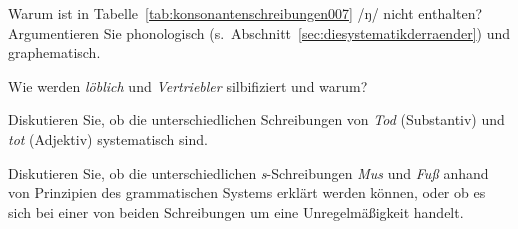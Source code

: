 \Uebung[\tristar]{} \label{exc:phonologischeschreibprinzipien07} Warum ist in Tabelle~\ref{tab:konsonantenschreibungen007} /ŋ/ nicht enthalten?
Argumentieren Sie phonologisch (s.\ Abschnitt~\ref{sec:diesystematikderraender}) und graphematisch.

\Uebung[\tristar]{} \label{exc:phonologischeschreibprinzipien08} Wie werden \textit{löblich} und \textit{Vertriebler} silbifiziert und warum?

\Uebung[\tristar]{} \label{exc:phonologischeschreibprinzipien09} Diskutieren Sie, ob die unterschiedlichen Schreibungen von \textit{Tod} (Substantiv) und \textit{tot} (Adjektiv) systematisch sind.

\Uebung[\tristar]{} \label{exc:phonologischeschreibprinzipien10} Diskutieren Sie, ob die unterschiedlichen \textit{s}-Schreibungen \textit{Mus} und \textit{Fuß} anhand von Prinzipien des grammatischen Systems erklärt werden können, oder ob es sich bei einer von beiden Schreibungen um eine Unregelmäßigkeit handelt.
